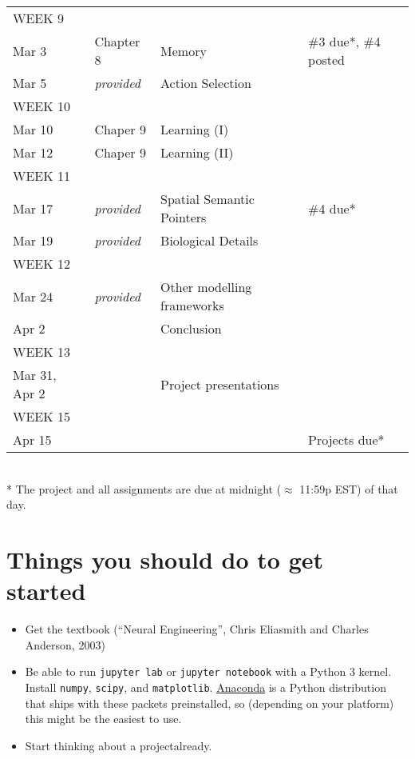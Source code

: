 \documentclass[10pt,letterpaper,oneside]{article}
\begin{document}
\begin{center}
\begin{tabular}{p{2.5cm} p{2.5cm} p{6cm} p{3.75cm}}
	\footnotesize WEEK 9 & & & \\
	Mar 3 &
	Chapter 8 &
	Memory &
	\#3 due*, \#4 posted\\
	Mar 5 &
	\emph{provided} &
	Action Selection &
	\\[0.125cm]

	\footnotesize WEEK 10 & & & \\
	Mar 10 &
	Chaper 9 &
	Learning (I) &
	\\
	Mar 12 &
	Chaper 9 &
	Learning (II) &
	\\[0.125cm]

	\footnotesize WEEK 11 & & & \\
	Mar 17 &
	\emph{provided} &
	Spatial Semantic Pointers &
	\#4 due*\\
	Mar 19 &
	\emph{provided} &
	Biological Details &
	\\[0.125cm]

	\footnotesize WEEK 12 & & & \\
	Mar 24 &
	\emph{provided} &
	Other modelling frameworks &
	\\
	Apr 2 &
	&
	Conclusion &
	\\[0.125cm]

	\footnotesize WEEK 13 & & & \\
	Mar 31, Apr 2 &
	&
	Project presentations &
	\\[0.125cm]

	\footnotesize WEEK 15 & & & \\
	Apr 15 &
	&
	&
	Projects due* \\
	\bottomrule
\end{tabular}\\[0.2cm]
\footnotesize
* The project and all assignments are due at midnight ($\approx$ 11:59p EST) of that day.
\end{center}

\newpage

\section{Things you should do to get started}

\begin{itemize}
	\item Get the textbook (\enquote{Neural Engineering}, Chris Eliasmith and Charles Anderson, 2003)
	\item Be able to run \texttt{jupyter lab} or \texttt{jupyter notebook} with a Python 3 kernel. Install \texttt{numpy}, \texttt{scipy}, and \texttt{matplotlib}. \href{https://www.anaconda.com/distribution/}{Anaconda} is a Python distribution that ships with these packets preinstalled, so (depending on your platform) this might be the easiest to use.
	\item Start thinking about a project\textellipsis already.
\end{itemize}

\printbibliography
\end{document}
